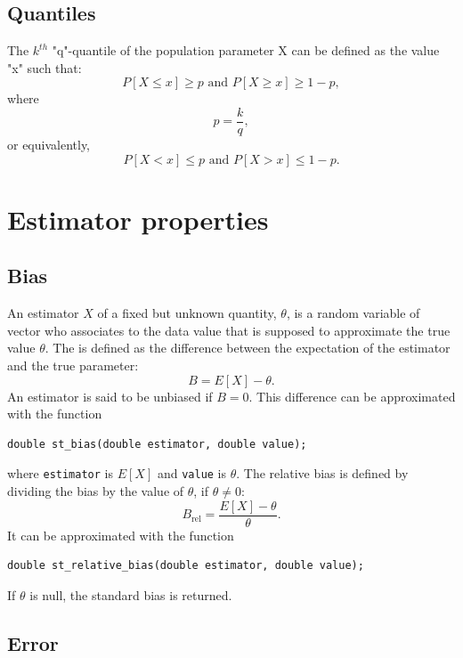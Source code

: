 \subsection{Quantiles}

The $k^{th}$ "q"-quantile of the population parameter X can be defined as the value "x" such that:
\[
P[X \leq x] \geq p \mbox{ and } P[X \geq x] \geq 1-p,
\]
where
\[
p = \frac{k}{q},
\]
or equivalently,
\[
P[X < x] \leq p \mbox{ and } P[X > x] \leq 1-p.
\]

\section{Estimator properties}

\subsection{Bias}

An estimator $X$ of a fixed but unknown quantity, $\theta$,
is a random variable of vector who associates to the data value that
is supposed to approximate the true value $\theta$.
The  is defined as the difference between the expectation
of the estimator and the true parameter:
\[
B = E[X]-\theta.
\]
An estimator is said to be unbiased if $B = 0$.
This difference can be approximated with the function
\begin{verbatim}
double st_bias(double estimator, double value);
\end{verbatim}
where \verb|estimator| is $E[X]$ and \verb|value| is
$\theta$.
The relative bias is defined by dividing the bias by the value of
$\theta$, if $\theta \neq 0$:
\[
B_{\mbox{rel}} = \frac{E[X]-\theta}{\theta}.
\]
It can be approximated with the function
\begin{verbatim}
double st_relative_bias(double estimator, double value);
\end{verbatim}
If $\theta$ is null, the standard bias is returned.

\subsection{Error}


